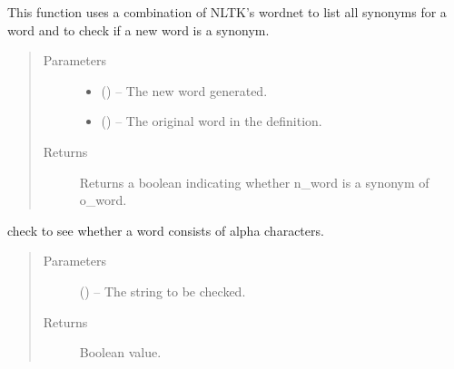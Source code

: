 \documentclass[letterpaper,10pt,english]{sphinxmanual}
\begin{document}
\begin{fulllineitems}
\label{\detokenize{code:hp_spells.is_synonym}}
This function uses a combination of NLTK's wordnet to 
list all synonyms for a word and to check if a new word is a synonym.
\begin{quote}\begin{description}
\item[{Parameters}] \leavevmode\begin{itemize}
\item {} 
 () -- The new word generated.

\item {} 
 () -- The original word in the definition.

\end{itemize}

\item[{Returns}] \leavevmode
Returns a boolean indicating whether n\_word is a synonym of o\_word.

\end{description}\end{quote}

\end{fulllineitems}


\begin{fulllineitems}
\label{\detokenize{code:hp_spells.is_valid}}
check to see whether a word consists of alpha characters.
\begin{quote}\begin{description}
\item[{Parameters}] \leavevmode
{} () -- The string to be checked.

\item[{Returns}] \leavevmode
Boolean value.

\end{description}\end{quote}

\end{fulllineitems}

\end{document}
